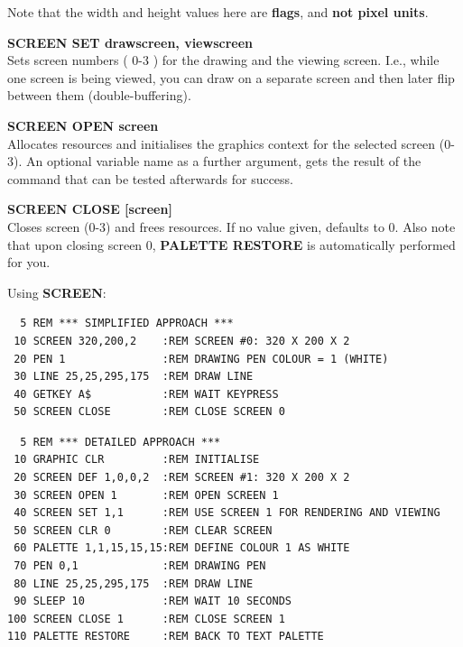 \begin{description}[leftmargin=2cm,style=nextline]
                Note that the width and height values here are {\bf flags},
                and {\bf not pixel units}.

                {\bf SCREEN SET drawscreen, viewscreen} \\
                Sets screen numbers
                ( 0-3 ) for the drawing and the viewing screen. I.e.,
                while one screen is being viewed, you can draw on a
                separate screen and then later flip between them
                (double-buffering).

                {\bf SCREEN OPEN screen} \\
                Allocates resources and
                initialises the graphics context for the selected
                screen (0-3). An optional variable name as
                a further argument, gets the result of the
                command that can be tested afterwards for success.

                {\bf SCREEN CLOSE [screen] } \\
                Closes screen (0-3) and frees resources. If no value given,
                defaults to 0. Also note that upon closing screen 0,
                {\bf PALETTE RESTORE} is automatically performed for you.

\item [Example:] Using {\bf SCREEN}:
\begin{tcolorbox}[colback=black,coltext=white]
\verbatimfont{\codefont}
\begin{verbatim}
  5 REM *** SIMPLIFIED APPROACH ***
 10 SCREEN 320,200,2    :REM SCREEN #0: 320 X 200 X 2
 20 PEN 1               :REM DRAWING PEN COLOUR = 1 (WHITE)
 30 LINE 25,25,295,175  :REM DRAW LINE
 40 GETKEY A$           :REM WAIT KEYPRESS
 50 SCREEN CLOSE        :REM CLOSE SCREEN 0
\end{verbatim}
\end{tcolorbox}
\begin{tcolorbox}[colback=black,coltext=white]

\verbatimfont{\codefont}
\begin{verbatim}
  5 REM *** DETAILED APPROACH ***
 10 GRAPHIC CLR         :REM INITIALISE
 20 SCREEN DEF 1,0,0,2  :REM SCREEN #1: 320 X 200 X 2
 30 SCREEN OPEN 1       :REM OPEN SCREEN 1
 40 SCREEN SET 1,1      :REM USE SCREEN 1 FOR RENDERING AND VIEWING
 50 SCREEN CLR 0        :REM CLEAR SCREEN
 60 PALETTE 1,1,15,15,15:REM DEFINE COLOUR 1 AS WHITE
 70 PEN 0,1             :REM DRAWING PEN
 80 LINE 25,25,295,175  :REM DRAW LINE
 90 SLEEP 10            :REM WAIT 10 SECONDS
100 SCREEN CLOSE 1      :REM CLOSE SCREEN 1
110 PALETTE RESTORE     :REM BACK TO TEXT PALETTE
\end{verbatim}
\end{tcolorbox}
\end{description}


